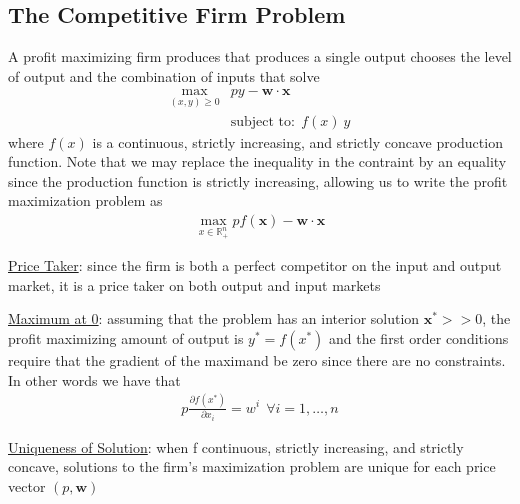 \documentclass{article}
\begin{document}
\subsection{The Competitive Firm Problem}
A profit maximizing firm produces that produces a single output chooses the level of output and the combination of inputs that solve
\begin{align*}
  \max_{(x,y) \geq 0} &py - \mathbf{w} \cdot \mathbf{x} \\
  &\text{subject to:} \ \ f(x) \ y
\end{align*}
where $f(x)$ is a continuous, strictly increasing, and strictly concave production function. Note that we may replace the inequality in the contraint by an equality since the production function is strictly increasing, allowing us to write the profit maximization problem as
\begin{gather*}
  \max_{x \in \mathbb{R}_{+}^{n}} pf(\mathbf{x}) - \mathbf{w} \cdot \mathbf{x}
\end{gather*}
\par \vspace{0.3em}
  \underline{Price Taker}: since the firm is both a perfect competitor on the input and output market, it is a price taker on both output and input markets
  \par
  \underline{Maximum at 0}: assuming that the problem has an interior solution $\mathbf{x}^{*} >>0$, the profit maximizing amount of output is $y^{*} = f(x^{*})$ and the first order conditions require that the gradient of the maximand be zero since there are no constraints. In other words we have that
  \begin{gather*}
    p \frac{\partial f(x^{*})}{\partial x_{i}} = w^{i} \ \ \forall i = 1, \dots, n
  \end{gather*}
  \par
  \underline{Uniqueness of Solution}: when f continuous, strictly increasing, and strictly concave, solutions to the firm's maximization problem are unique for each price vector $(p, \mathbf{w})$
  \par
\vspace{6mm}
\end{document}

